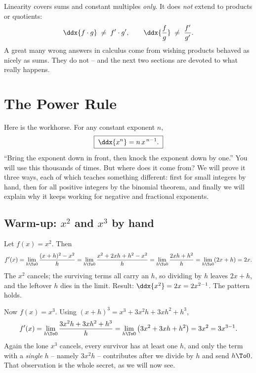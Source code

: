 \begin{trapbox}
Linearity covers sums and constant multiples \emph{only}. It does \emph{not} extend to
products or quotients:
\[
  \ddx{f\cdot g}\;\ne\; f'\cdot g',
  \qquad
  \ddx{\frac{f}{g}}\;\ne\;\frac{f'}{g'}.
\]
A great many wrong answers in calculus come from wishing products behaved as nicely as
sums. They do not -- and the next two sections are devoted to what really happens.
\end{trapbox}

\section{The Power Rule}
\label{ch11:power-rule}

Here is the workhorse. For any constant exponent $n$,
\[
  \boxed{\;\ddx{x^n} = n\,x^{\,n-1}.\;}
\]
``Bring the exponent down in front, then knock the exponent down by one.'' You will use
this thousands of times. But where does it come from? We will prove it three ways, each
of which teaches something different: first for small integers by hand, then for all
positive integers by the binomial theorem, and finally we will explain why it keeps
working for negative and fractional exponents.

\subsection{Warm-up: $x^2$ and $x^3$ by hand}

\begin{example}\label{ch11:ex-x2}
Let $f(x)=x^2$. Then
\[
  f'(x)=\lim_{h\To 0}\frac{(x+h)^2 - x^2}{h}
       =\lim_{h\To 0}\frac{x^2 + 2xh + h^2 - x^2}{h}
       =\lim_{h\To 0}\frac{2xh + h^2}{h}
       =\lim_{h\To 0}(2x + h)
       = 2x.
\]
The $x^2$ cancels; the surviving terms all carry an $h$, so dividing by $h$ leaves
$2x+h$, and the leftover $h$ dies in the limit. Result: $\ddx{x^2}=2x = 2x^{2-1}$. The
pattern holds.
\end{example}

\begin{example}\label{ch11:ex-x3}
Now $f(x)=x^3$. Using $(x+h)^3 = x^3 + 3x^2 h + 3x h^2 + h^3$,
\[
  f'(x)=\lim_{h\To 0}\frac{3x^2 h + 3x h^2 + h^3}{h}
       =\lim_{h\To 0}\big(3x^2 + 3x h + h^2\big)
       = 3x^2 = 3x^{3-1}.
\]
Again the lone $x^3$ cancels, every survivor has at least one $h$, and only the term with
a \emph{single} $h$ -- namely $3x^2 h$ -- contributes after we divide by $h$ and send
$h\To 0$. That observation is the whole secret, as we will now see.
\end{example}


